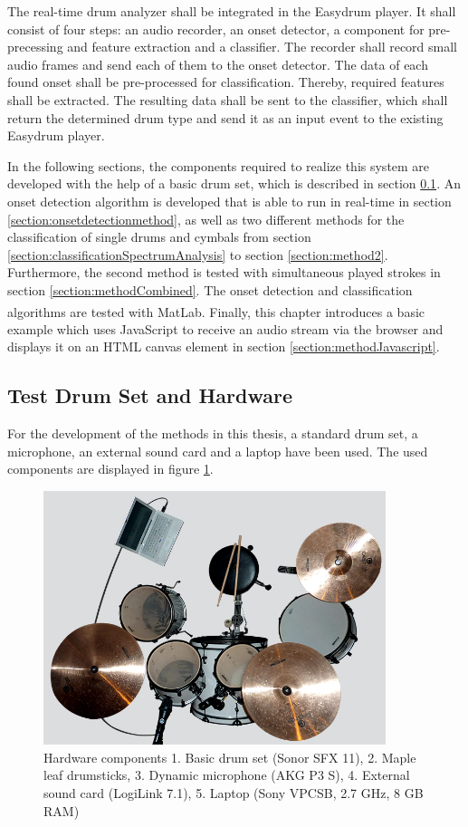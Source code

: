 The real-time drum analyzer shall be integrated in the Easydrum player. It shall consist of four steps: an audio recorder, an onset detector, a component for pre-precessing and feature extraction and a classifier. The recorder shall record small audio frames and send each of them to the onset detector. The data of each found onset shall be pre-processed for classification. Thereby, required features shall be extracted. The resulting data shall be sent to the classifier, which shall return the determined drum type and send it as an input event to the existing Easydrum player. 

In the following sections, the components required to realize this system are developed with the help of a basic drum set, which is described in section \ref{section:hardware}. An onset detection algorithm is developed that is able to run in real-time in section \ref{section:onsetdetectionmethod}, as well as two different methods for the classification of single drums and cymbals from section \ref{section:classificationSpectrumAnalysis} to section \ref{section:method2}. Furthermore, the second method is tested with simultaneous played strokes in section \ref{section:methodCombined}. The onset detection and classification algorithms are tested with MatLab\textsuperscript{\textregistered}. Finally, this chapter introduces a basic example which uses JavaScript to receive an audio stream via the browser and displays it on an HTML canvas element in section \ref{section:methodJavascript}.

\subsection{Test Drum Set and Hardware} \label{section:hardware}

For the development of the methods in this thesis, a standard drum set, a microphone, an external sound card and a laptop have been used. The used components are displayed in figure \ref{fig:components}.

\begin{figure}
	\includegraphics[width=10cm]{images/drumset/drumset_01.jpg}
	\caption{Hardware components 1. Basic drum set (Sonor SFX 11), 2. Maple leaf drumsticks, 3. Dynamic microphone (AKG P3 S), 4. External sound card (LogiLink 7.1), 5. Laptop (Sony VPCSB, 2.7 GHz, 8 GB RAM)}
	\label{fig:components} 
\end{figure}

